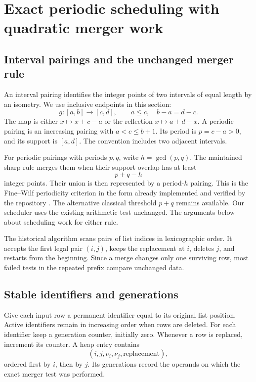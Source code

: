 \section{Exact periodic scheduling with quadratic merger work}
\label{sec:queue}

\subsection{Interval pairings and the unchanged merger rule}

An interval pairing identifies the integer points of two intervals of equal
length by an isometry. We use inclusive endpoints in this section:
\[
 g:[a,b]\longrightarrow[c,d],\qquad a\le c,\quad b-a=d-c.
\]
The map is either \(x\mapsto x+c-a\) or the reflection
\(x\mapsto a+d-x\). A periodic pairing is an increasing pairing with
\(a<c\le b+1\). Its period is \(p=c-a>0\), and its support is \([a,d]\).
The convention includes two adjacent intervals.

For periodic pairings with periods \(p,q\), write \(h=\gcd(p,q)\).
The maintained sharp rule merges them when their support overlap has at least
\[
 p+q-h
\]
integer points. Their union is then represented by a period-\(h\)
pairing. This is the Fine--Wilf periodicity criterion in the form already
implemented and verified by the repository \cite{FineWilf1965,ProveIt2026}.
The alternative classical threshold \(p+q\) remains available. Our
scheduler uses the existing arithmetic test unchanged. The arguments below
about scheduling work for either rule.

The historical algorithm scans pairs of list indices in lexicographic order.
It accepts the first legal pair \((i,j)\), keeps the replacement at \(i\),
deletes \(j\), and restarts from the beginning. Since a merge changes only
one surviving row, most failed tests in the repeated prefix compare
unchanged data.

\subsection{Stable identifiers and generations}

Give each input row a permanent identifier equal to its original list
position. Active identifiers remain in increasing order when rows are
deleted. For each identifier keep a generation counter, initially zero.
Whenever a row is replaced, increment its counter. A heap entry contains
\[
 (i,j,\nu_i,\nu_j,\text{replacement}),
\]
ordered first by \(i\), then by \(j\). Its generations record the operands
on which the exact merger test was performed.

